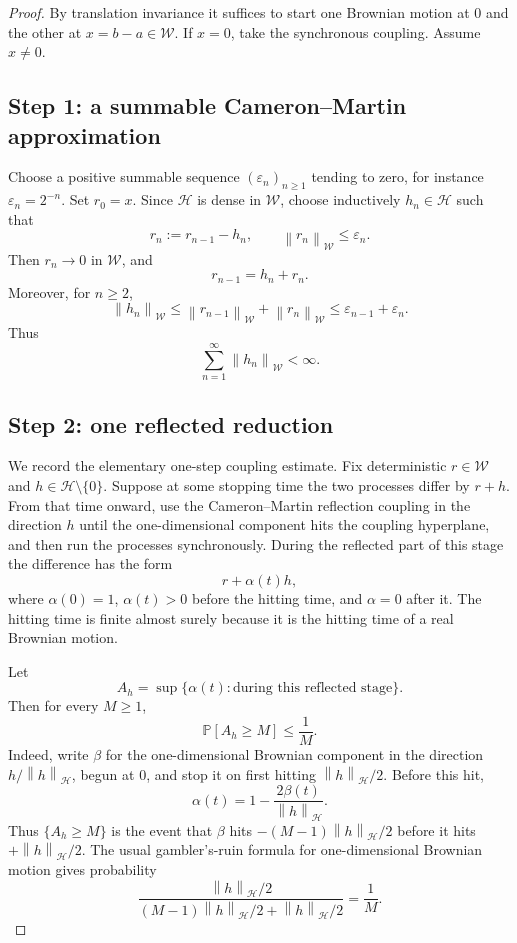 \documentclass[11pt]{article}
\newcommand{\W}{\mathcal W}
\newcommand{\HH}{\mathcal H}
\newcommand{\norm}[1]{\left\lVert #1 \right\rVert}
\newcommand{\Prob}{\mathbb P}
\begin{document}
\begin{proof}
By translation invariance it suffices to start one Brownian motion at \(0\)
and the other at \(x=b-a\in\W\).  If \(x=0\), take the synchronous coupling.
Assume \(x\ne0\).

\subsection*{Step 1: a summable Cameron--Martin approximation}

Choose a positive summable sequence \((\varepsilon_n)_{n\ge1}\) tending to
zero, for instance \(\varepsilon_n=2^{-n}\).  Set \(r_0=x\).  Since \(\HH\)
is dense in \(\W\), choose inductively \(h_n\in\HH\) such that
\[
        r_n:=r_{n-1}-h_n,\qquad
        \norm{r_n}_{\W}\le \varepsilon_n .
\]
Then \(r_n\to0\) in \(\W\), and
\[
        r_{n-1}=h_n+r_n .
\]
Moreover, for \(n\ge2\),
\[
        \norm{h_n}_{\W}
        \le \norm{r_{n-1}}_{\W}+\norm{r_n}_{\W}
        \le \varepsilon_{n-1}+\varepsilon_n .
\]
Thus
\[
        \sum_{n=1}^\infty \norm{h_n}_{\W}<\infty .
\]

\subsection*{Step 2: one reflected reduction}

We record the elementary one-step coupling estimate.  Fix deterministic
\(r\in\W\) and \(h\in\HH\setminus\{0\}\).  Suppose at some stopping time the
two processes differ by \(r+h\).  From that time onward, use the
Cameron--Martin reflection coupling in the direction \(h\) until the
one-dimensional component hits the coupling hyperplane, and then run the
processes synchronously.  During the reflected part of this stage the
difference has the form
\[
        r+\alpha(t)h ,
\]
where \(\alpha(0)=1\), \(\alpha(t)>0\) before the hitting time, and
\(\alpha=0\) after it.  The hitting time is finite almost surely because it
is the hitting time of a real Brownian motion.

Let
\[
        A_h=\sup\{\alpha(t):\text{during this reflected stage}\}.
\]
Then for every \(M\ge1\),
\[
        \Prob[A_h\ge M]\le \frac1M .       \tag{1}
\]
Indeed, write \(\beta\) for the one-dimensional Brownian component in the
direction \(h/\norm{h}_{\HH}\), begun at \(0\), and stop it on first hitting
\(\norm{h}_{\HH}/2\).  Before this hit,
\[
        \alpha(t)=1-\frac{2\beta(t)}{\norm{h}_{\HH}} .
\]
Thus \(\{A_h\ge M\}\) is the event that \(\beta\) hits
\(- (M-1)\norm{h}_{\HH}/2\) before it hits \(+\norm{h}_{\HH}/2\).  The usual
gambler's-ruin formula for one-dimensional Brownian motion gives probability
\[
        \frac{\norm{h}_{\HH}/2}
        {(M-1)\norm{h}_{\HH}/2+\norm{h}_{\HH}/2}
        =\frac1M .
\]


\end{proof}
\end{document}

